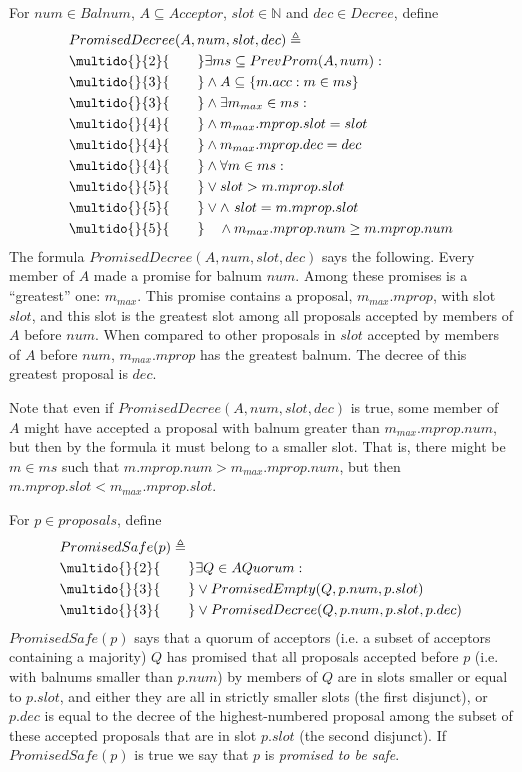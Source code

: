 \documentclass[12pt,a4paper,en]{pracamgr}
\newcommand{\ti}[1]{\textit{#1}}
\newcommand{\mbb}[1]{\mathbb{#1}}
\newcommand{\ind}[1]{\multido{}{#1}{\qquad}}
\begin{document}
For $num \in Balnum$, $A \subseteq Acceptor$, $slot \in \mbb N$ and $dec \in Decree$, define
\begin{align*}
    & PromisedDecree(A, num, slot, dec) \triangleq\\
    & \ind{2} \exists ms \subseteq PrevProm(A, num):\\
    & \ind{3} \land A \subseteq \{m.acc: m \in ms\}\\
    & \ind{3} \land \exists m_{max} \in ms:\\
    & \ind{4} \land m_{max}.mprop.slot = slot\\
    & \ind{4} \land m_{max}.mprop.dec = dec\\
    & \ind{4} \land \forall m \in ms:\\
    & \ind{5} \lor slot > m.mprop.slot\\
    & \ind{5} \lor \land\ slot = m.mprop.slot\\
    & \ind{5} \quad \land m_{max}.mprop.num \ge m.mprop.num
\end{align*}
The formula $PromisedDecree(A, num, slot, dec)$ says the following. Every member of $A$ made a promise for balnum $num$. Among these promises is a ``greatest'' one: $m_{max}$. This promise contains a proposal, $m_{max}.mprop$, with slot $slot$, and this slot is the greatest slot among all proposals accepted by members of $A$ before $num$. When compared to other proposals in $slot$ accepted by members of $A$ before $num$, $m_{max}.mprop$ has the greatest balnum. The decree of this greatest proposal is $dec$.

Note that even if $PromisedDecree(A, num, slot, dec)$ is true, some member of $A$ might have accepted a proposal with balnum greater than $m_{max}.mprop.num$, but then by the formula it must belong to a smaller slot. That is, there might be $m \in ms$ such that $m.mprop.num > m_{max}.mprop.num$, but then $m.mprop.slot < m_{max}.mprop.slot$.

For $p \in proposals$, define
\begin{align*}
    & PromisedSafe(p) \triangleq\\
    & \ind{2} \exists Q \in AQuorum:\\
    & \ind{3} \lor PromisedEmpty(Q, p.num, p.slot)\\
    & \ind{3} \lor PromisedDecree(Q, p.num, p.slot, p.dec)
\end{align*}
$PromisedSafe(p)$ says that a quorum of acceptors (i.e. a subset of acceptors containing a majority) $Q$ has promised that all proposals accepted before $p$ (i.e. with balnums smaller than $p.num$) by members of $Q$ are in slots smaller or equal to $p.slot$, and either they are all in strictly smaller slots (the first disjunct), or $p.dec$ is equal to the decree of the highest-numbered proposal among the subset of these accepted proposals that are in slot $p.slot$ (the second disjunct). If $PromisedSafe(p)$ is true we say that $p$ is \ti{promised to be safe}.
\end{document}
